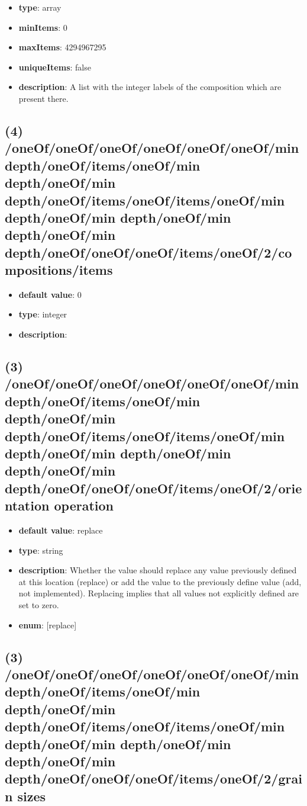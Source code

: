 \begin{itemize}[leftmargin=3em]\item {\bf type}: array
\item {\bf minItems}: 0
\item {\bf maxItems}: 4294967295
\item {\bf uniqueItems}: false
\item {\bf description}: A list with the integer labels of the composition which are present there.
\end{itemize}\subsection{(4) /oneOf/oneOf/oneOf/oneOf/oneOf/oneOf/min depth/oneOf/items/oneOf/min depth/oneOf/min depth/oneOf/items/oneOf/items/oneOf/min depth/oneOf/min depth/oneOf/min depth/oneOf/min depth/oneOf/oneOf/oneOf/items/oneOf/2/compositions/items}
\begin{itemize}[leftmargin=4em]\item {\bf default value}: 0
\item {\bf type}: integer
\item {\bf description}: 
\end{itemize}\subsection{(3) /oneOf/oneOf/oneOf/oneOf/oneOf/oneOf/min depth/oneOf/items/oneOf/min depth/oneOf/min depth/oneOf/items/oneOf/items/oneOf/min depth/oneOf/min depth/oneOf/min depth/oneOf/min depth/oneOf/oneOf/oneOf/items/oneOf/2/orientation operation}
\begin{itemize}[leftmargin=3em]\item {\bf default value}: replace
\item {\bf type}: string
\item {\bf description}: Whether the value should replace any value previously defined at this location (replace) or add the value to the previously define value (add, not implemented). Replacing implies that all values not explicitly defined are set to zero.
\item {\bf enum}: [replace]\end{itemize}\subsection{(3) /oneOf/oneOf/oneOf/oneOf/oneOf/oneOf/min depth/oneOf/items/oneOf/min depth/oneOf/min depth/oneOf/items/oneOf/items/oneOf/min depth/oneOf/min depth/oneOf/min depth/oneOf/min depth/oneOf/oneOf/oneOf/items/oneOf/2/grain sizes}
